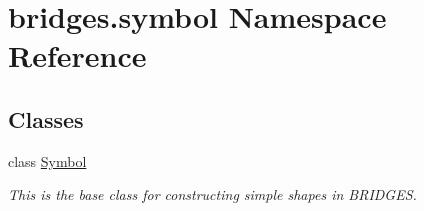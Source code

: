 \hypertarget{namespacebridges_1_1symbol}{}\section{bridges.\+symbol Namespace Reference}
\label{namespacebridges_1_1symbol}
\subsection*{Classes}
\begin{DoxyCompactItemize}
\item 
class \hyperlink{classbridges_1_1symbol_1_1_symbol}{Symbol}
\begin{DoxyCompactList}\small\item\em This is the base class for constructing simple shapes in B\+R\+I\+D\+G\+ES. \end{DoxyCompactList}\end{DoxyCompactItemize}
